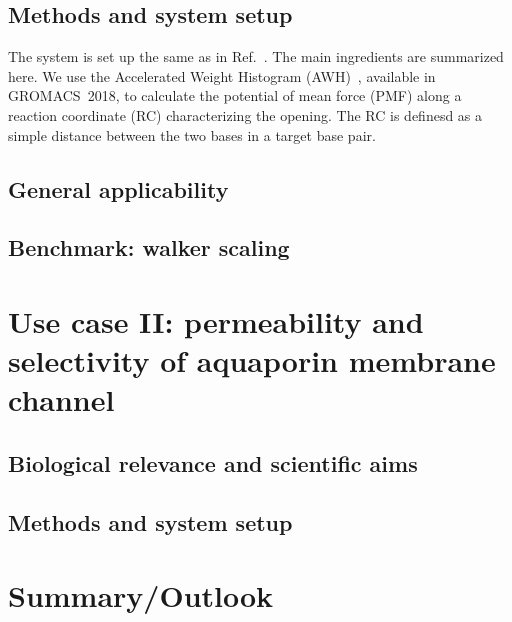 \documentclass[11pt,a4paper]{article}
\begin{document}
\subsection{Methods and system setup}
The system is set up the same as in Ref.~\cite{lindahl2017sequence}. The main ingredients are summarized here.
We use the Accelerated Weight Histogram (AWH)~\cite{lindahl2014accelerated}, available in GROMACS~2018, to calculate the potential of mean force (PMF) along a reaction coordinate (RC) characterizing the opening. The RC is definesd as a simple distance between the two bases in a target base pair. %

\subsection{General applicability}
\cite{zhang2018accurate}

\subsection{Benchmark: walker scaling}



\section{Use case II: permeability and selectivity of aquaporin membrane channel}
\subsection{Biological relevance and scientific aims}
\cite{lindahl2018permeability}
\subsection{Methods and system setup}

\section{Summary/Outlook}


\end{document}
